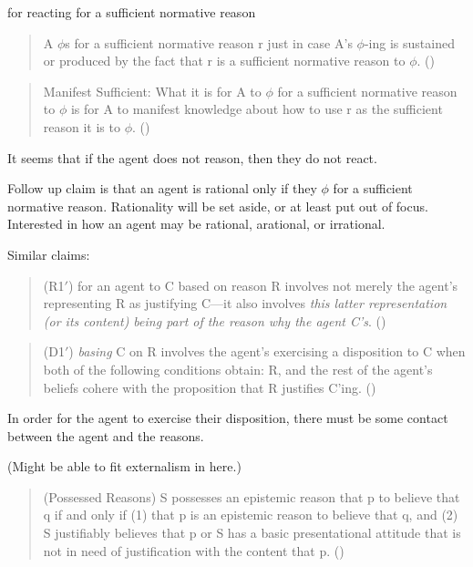 \documentclass[10pt]{article}
\begin{document}
for reacting for a sufficient normative reason
\begin{quote}
  A \(\phi\)s for a sufficient normative reason r just in case A’s \(\phi\)-ing is sustained or produced by the fact that r is a sufficient normative reason to \(\phi\).\nolinebreak
  \mbox{}\hfill\mbox{(\citeyear[142]{Lord:2018aa})}
\end{quote}

\begin{quote}
  Manifest Sufficient: What it is for A to \(\phi\) for a sufficient normative reason to \(\phi\) is for A to manifest knowledge about how to use r as the sufficient reason it is to \(\phi\).\nolinebreak
  \mbox{}\hfill\mbox{(\citeyear[143]{Lord:2018aa})}
\end{quote}

It seems that if the agent does not reason, then they do not react.

Follow up claim is that an agent is rational only if they \(\phi\) for a sufficient normative reason.
Rationality will be set aside, or at least put out of focus.
Interested in how an agent may be rational, arational, or irrational.

Similar claims:

\begin{quote}
  (R1\('\)) for an agent to C based on reason R involves not merely the agent’s representing R as justifying C---it also involves \emph{this latter representation (or its content) being part of the reason why the agent C's}.\nolinebreak
  \mbox{}\hfill\mbox{(\citeyear[197]{Neta:2019aa})}
\end{quote}

\begin{quote}
  (D1\('\)) \emph{basing} C on R involves the agent's exercising a disposition to C when both of the following conditions obtain: R, and the rest of the agent’s beliefs cohere with the proposition that R justiﬁes C'ing.\nolinebreak
  \mbox{}\hfill\mbox{(\citeyear[194]{Neta:2019aa})}
\end{quote}

In order for the agent to exercise their disposition, there must be some contact between the agent and the reasons.

(Might be able to fit externalism in here.)

\begin{quote}
  (Possessed Reasons) S possesses an epistemic reason that p to believe that q if and only if (1) that p is an epistemic reason to believe that q, and (2) S justiﬁably believes that p or S has a basic presentational attitude that is not in need of justiﬁcation with the content that p.\nolinebreak
  \mbox{}\hfill\mbox{(\citeyear[5]{Schmidt:2019aa})}
\end{quote}
\end{document}
